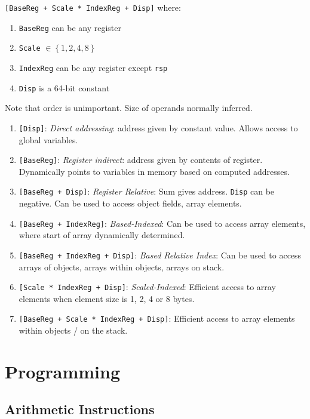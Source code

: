 \documentclass[twocolumn,english]{article}
\begin{document}
\texttt{{[}BaseReg + Scale {*} IndexReg + Disp{]}} where:
\begin{enumerate}
\item \texttt{BaseReg} can be any register
\item \texttt{Scale} $\in\left\{ 1,2,4,8\right\} $
\item \texttt{IndexReg} can be any register except \texttt{rsp}
\item \texttt{Disp} is a 64-bit constant
\end{enumerate}
Note that order is unimportant. Size of operands normally inferred.
\begin{enumerate}
\item \texttt{{[}Disp{]}}: \emph{Direct addressing}: address given by constant
value. Allows access to global variables.
\item \texttt{{[}BaseReg{]}}: \emph{Register indirect}: address given by
contents of register. Dynamically points to variables in memory based
on computed addresses.
\item \texttt{{[}BaseReg + Disp{]}}: \emph{Register Relative}: Sum gives
address. \texttt{Disp} can be negative. Can be used to access object
fields, array elements.
\item \texttt{{[}BaseReg + IndexReg{]}}: \emph{Based-Indexed}: Can be used
to access array elements, where start of array dynamically determined.
\item \texttt{{[}BaseReg + IndexReg + Disp{]}}: \emph{Based Relative Index}:
Can be used to access arrays of objects, arrays within objects, arrays
on stack.
\item \texttt{{[}Scale {*} IndexReg + Disp{]}}: \emph{Scaled-Indexed}: Efficient
access to array elements when element size is 1, 2, 4 or 8 bytes.
\item \texttt{{[}BaseReg + Scale {*} IndexReg + Disp{]}}: Efficient access
to array elements within objects / on the stack.
\end{enumerate}

\section{Programming}


\subsection{Arithmetic Instructions}
\end{document}
